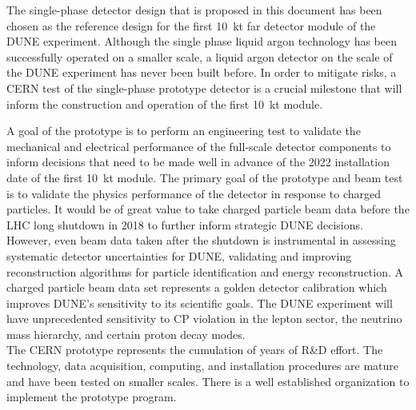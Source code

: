 \label{summary}
The single-phase detector design that is proposed in this document has been chosen as the reference design for the first 10~kt far detector module of the DUNE experiment.  Although the single phase liquid argon technology has been successfully operated on a smaller scale, a liquid argon detector on the scale of the DUNE experiment has never been built before.  In order to mitigate risks, a CERN test of the single-phase prototype detector is a crucial milestone that will inform the construction and operation of the first 10~kt module.

A goal of the prototype is to perform an engineering test to validate the mechanical and electrical performance of the full-scale detector components to inform decisions that need to be made well in advance of the 2022 installation date of the first 10~kt module.  
The primary goal of the prototype and beam test is  to validate the physics performance of the detector in response to charged particles.
It would be of great value to take charged particle beam data before the LHC long shutdown in 2018 to further inform strategic DUNE decisions.  
However, even beam data taken after the shutdown is instrumental in assessing systematic detector uncertainties for DUNE, validating and improving reconstruction algorithms for particle identification and energy reconstruction.  
A charged particle beam data set represents a golden detector calibration which improves DUNE's sensitivity to its scientific goals. 
The DUNE experiment will have unprecedented sensitivity to CP violation in the lepton sector, the neutrino mass hierarchy, and certain proton decay modes.   \\
%
The CERN prototype represents the cumulation of years of R\&D effort.  The technology, data acquisition, computing, and installation procedures are mature and have been tested on smaller scales.  There is a well established organization to implement the prototype program.  

